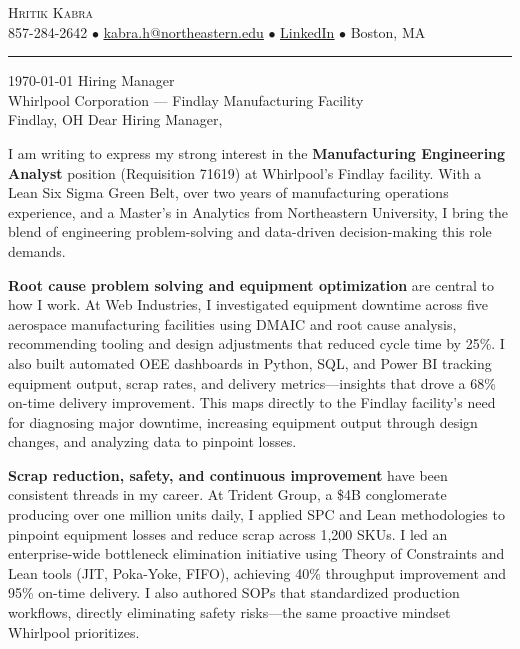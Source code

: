 \documentclass[letterpaper,11pt]{article}
\begin{document}
\begin{flushleft}
{\Large \scshape \color{heading} Hritik Kabra} \\[2pt]
\small 857-284-2642 \enspace$\bullet$\enspace
\href{mailto:kabra.h@northeastern.edu}{\underline{kabra.h@northeastern.edu}} \enspace$\bullet$\enspace
\href{https://www.linkedin.com/in/hritikkabra888}{\underline{LinkedIn}} \enspace$\bullet$\enspace
Boston, MA
\end{flushleft}
\vspace{2pt}
\noindent\textcolor{heading}{\rule{\textwidth}{0.8pt}}
\vspace{8pt}
\noindent \today
\vspace{8pt}
\noindent Hiring Manager \\
Whirlpool Corporation --- Findlay Manufacturing Facility \\
Findlay, OH
\vspace{8pt}
\noindent Dear Hiring Manager,

I am writing to express my strong interest in the \textbf{Manufacturing Engineering Analyst} position (Requisition 71619) at Whirlpool's Findlay facility. With a Lean Six Sigma Green Belt, over two years of manufacturing operations experience, and a Master's in Analytics from Northeastern University, I bring the blend of engineering problem-solving and data-driven decision-making this role demands.

\textbf{Root cause problem solving and equipment optimization} are central to how I work. At Web Industries, I investigated equipment downtime across five aerospace manufacturing facilities using DMAIC and root cause analysis, recommending tooling and design adjustments that reduced cycle time by 25\%. I also built automated OEE dashboards in Python, SQL, and Power BI tracking equipment output, scrap rates, and delivery metrics---insights that drove a 68\% on-time delivery improvement. This maps directly to the Findlay facility's need for diagnosing major downtime, increasing equipment output through design changes, and analyzing data to pinpoint losses.

\textbf{Scrap reduction, safety, and continuous improvement} have been consistent threads in my career. At Trident Group, a \$4B conglomerate producing over one million units daily, I applied SPC and Lean methodologies to pinpoint equipment losses and reduce scrap across 1,200 SKUs. I led an enterprise-wide bottleneck elimination initiative using Theory of Constraints and Lean tools (JIT, Poka-Yoke, FIFO), achieving 40\% throughput improvement and 95\% on-time delivery. I also authored SOPs that standardized production workflows, directly eliminating safety risks---the same proactive mindset Whirlpool prioritizes.
\end{document}
